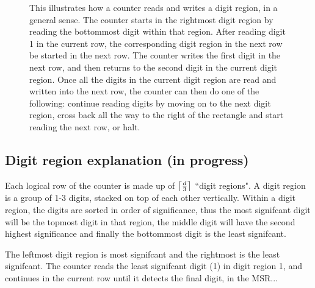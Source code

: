 \begin{figure}[H]
    \caption{\label{fig:counter_read_digit_return_read_digit_general_case3}
    This illustrates how a counter reads and writes a digit region, in a general sense.
    The counter starts in the rightmost digit region by reading the bottommost digit within
    that region. After reading digit 1 in the current row, the corresponding digit region in
    the next row be started in the next row. The counter writes the first digit in the next
    row, and then returns to the second digit in the current digit region.
    Once all the digits in the current digit region are read and written into the next row,
    the counter can then do one of the following: continue reading digits by moving on to the
    next digit region, cross back all the way to the right of the rectangle and start reading
    the next row, or halt.}
\end{figure}


\subsection{ Digit region explanation (in progress) }

Each logical row of the counter is made up of $\ceil*{\frac{d}{3}}$ ``digit regions". A digit region
is a group of 1-3 digits, stacked on top of each other vertically. Within a digit region, the digits are
sorted in order of significance, thus the most signifcant digit will be the topmost digit in that region,
the middle digit will have the second highest significance and finally the bottommost digit is the least
signifcant.

The leftmost digit region is most signifcant and the rightmost is the least signifcant.
The counter reads the least signifcant digit (1) in digit region 1, and continues in the current row
until it detects the final digit, in the MSR...


